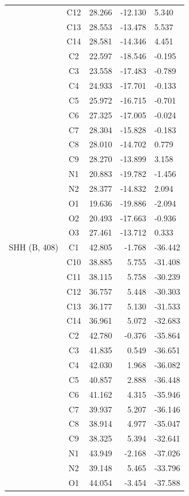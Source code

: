 \begin{longtable}{@{}lcrr@{}}
   & C12 & 28.266 & -12.130 & 5.340 \\
   & C13 & 28.553 & -13.478 & 5.537 \\
   & C14 & 28.581 & -14.346 & 4.451 \\
   & C2 & 22.597 & -18.546 & -0.195 \\
   & C3 & 23.558 & -17.483 & -0.789 \\
   & C4 & 24.933 & -17.701 & -0.133 \\
   & C5 & 25.972 & -16.715 & -0.701 \\
   & C6 & 27.325 & -17.005 & -0.024 \\
   & C7 & 28.304 & -15.828 & -0.183 \\
   & C8 & 28.010 & -14.702 & 0.779 \\
   & C9 & 28.270 & -13.899 & 3.158 \\
   & N1 & 20.883 & -19.782 & -1.456 \\
   & N2 & 28.377 & -14.832 & 2.094 \\
   & O1 & 19.636 & -19.886 & -2.094 \\
   & O2 & 20.493 & -17.663 & -0.936 \\
   & O3 & 27.461 & -13.712 & 0.333 \\
  \cmidrule(r){1-5}
  SHH (B, 408) & C1 & 42.805 & -1.768 & -36.442 \\
   & C10 & 38.885 & 5.755 & -31.408 \\
   & C11 & 38.115 & 5.758 & -30.239 \\
   & C12 & 36.757 & 5.448 & -30.303 \\
   & C13 & 36.177 & 5.130 & -31.533 \\
   & C14 & 36.961 & 5.072 & -32.683 \\
   & C2 & 42.780 & -0.376 & -35.864 \\
   & C3 & 41.835 & 0.549 & -36.651 \\
   & C4 & 42.030 & 1.968 & -36.082 \\
   & C5 & 40.857 & 2.888 & -36.448 \\
   & C6 & 41.162 & 4.315 & -35.946 \\
   & C7 & 39.937 & 5.207 & -36.146 \\
   & C8 & 38.914 & 4.977 & -35.047 \\
   & C9 & 38.325 & 5.394 & -32.641 \\
   & N1 & 43.949 & -2.168 & -37.026 \\
   & N2 & 39.148 & 5.465 & -33.796 \\
   & O1 & 44.054 & -3.454 & -37.588 \\

\end{longtable}

